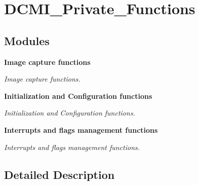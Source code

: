 \section{D\+C\+M\+I\+\_\+\+Private\+\_\+\+Functions}
\label{group__DCMI__Private__Functions}
\subsection*{Modules}
\begin{DoxyCompactItemize}
\item 
\textbf{ Image capture functions}
\begin{DoxyCompactList}\small\item\em Image capture functions. \end{DoxyCompactList}\item 
\textbf{ Initialization and Configuration functions}
\begin{DoxyCompactList}\small\item\em Initialization and Configuration functions. \end{DoxyCompactList}\item 
\textbf{ Interrupts and flags management functions}
\begin{DoxyCompactList}\small\item\em Interrupts and flags management functions. \end{DoxyCompactList}\end{DoxyCompactItemize}


\subsection{Detailed Description}
